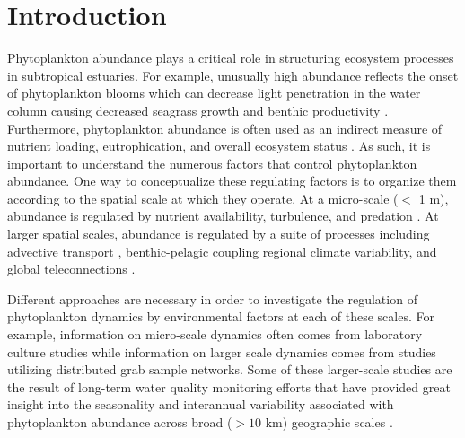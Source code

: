 \section{Introduction}
\label{intro}
Phytoplankton abundance plays a critical role in structuring ecosystem processes in subtropical estuaries. For example, unusually high abundance reflects the onset of phytoplankton blooms which can decrease light penetration in the water column causing decreased seagrass growth and benthic productivity \citep{kelble_2005}. Furthermore, phytoplankton abundance is often used as an indirect measure of nutrient loading, eutrophication, and overall ecosystem status \citep{boyer_2009}. As such, it is important to understand the numerous factors that control phytoplankton abundance. One way to conceptualize these regulating factors is to organize them according to the spatial scale at which they operate. At a micro-scale ($<$ 1 m), abundance is regulated by nutrient availability, turbulence, and predation \citep{mann2013dynamics}. At larger spatial scales, abundance is regulated by a suite of processes including advective transport \citep{dugdale2012river}, benthic-pelagic coupling \citep{zhang_2014, lawrence2004wind} regional climate variability, and global teleconnections \citep{briceno_climatic_2009}.

Different approaches are necessary in order to investigate the regulation of phytoplankton dynamics by environmental factors at each of these scales. For example, information on micro-scale dynamics often comes from laboratory culture studies while information on larger scale dynamics comes from studies utilizing distributed grab sample networks. Some of these larger-scale studies are the result of long-term water quality monitoring efforts that have provided great insight into the seasonality and interannual variability associated with phytoplankton abundance across broad ($>10$ km) geographic scales \citep{cloern_patterns_2010}.

